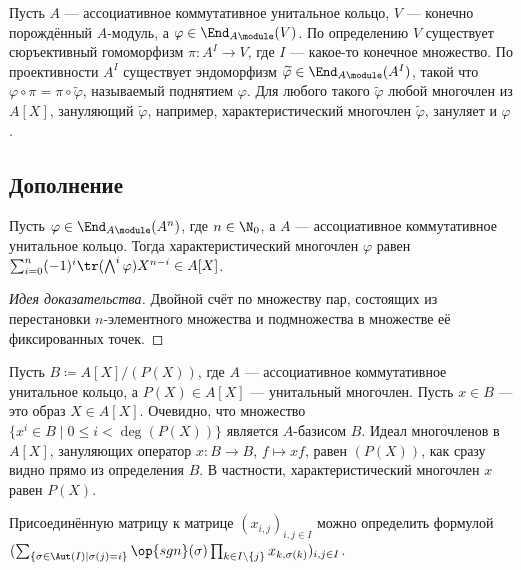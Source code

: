\documentclass[
	extrafontsizes,
	11pt,
	hyphens,
]{memoir}
\begin{document}
\begin{observation}
Пусть \(A\) --- ассоциативное коммутативное унитальное кольцо, \(V\) --- конечно порождённый \(A\)-модуль, а \(\varphi \in \End_{A\module}(V)\).
По определению \(V\) существует сюръективный гомоморфизм \(\pi : A^I \to V\), где \(I\) --- какое-то конечное множество.
По проективности \(A^I\)
существует эндоморфизм \(\widetilde{\varphi} \in \End_{A\module}(A^I)\), такой что \(\varphi \circ \pi = \pi \circ \widetilde{\varphi}\),
называемый поднятием \(\varphi\).
Для любого такого \(\widetilde{\varphi}\) любой многочлен из \(A[X]\), зануляющий \(\widetilde{\varphi}\), например, характеристический многочлен \(\widetilde{\varphi}\), зануляет и \(\varphi\).
\end{observation}

\subsection{Дополнение}

\begin{theorem} 
Пусть \(\varphi \in \End_{A\module}(A^n)\), где \(n \in \N_0\), а \(A\) --- ассоциативное коммутативное унитальное кольцо.
Тогда характеристический многочлен \(\varphi\) равен \(\sum_{i=0}^n (-1)^i \tr(\bigwedge^i \varphi) X^{n-i} \in A[X]\).
\end{theorem}

\begin{proof}[Идея доказательства]
Двойной счёт по множеству пар, состоящих из перестановки \(n\)-элементного множества и подмножества в множестве её фиксированных точек.
\end{proof}

\begin{observation}
Пусть \(B \coloneqq A[X]/(P(X))\), где \(A\) --- ассоциативное коммутативное унитальное кольцо, а \(P(X) \in A[X]\) --- унитальный многочлен. Пусть \(x \in B\) --- это образ \(X \in A[X]\).
Очевидно, что множество \(\{x^i \in B \mid 0 \leq i < \deg(P(X))\}\) является \(A\)-базисом \(B\).
Идеал многочленов в \(A[X]\), зануляющих оператор
\(x : B \to B\), \(f \mapsto xf\),
равен \((P(X))\), как сразу видно прямо из определения \(B\).
В частности, характеристический многочлен \(x\) равен \(P(X)\).
\end{observation}

\begin{observation}
Присоединённую матрицу к матрице \((x_{i,j})_{i,j \in I}\) можно определить формулой
\(
(\sum_{\{\sigma \in \Aut(I) \mid \sigma(j) = i\}} \op{sgn}(\sigma) \prod_{k \in I \setminus \{j\}} x_{k,\sigma(k)})_{i,j \in I}
\).
\end{observation}
\end{document}
